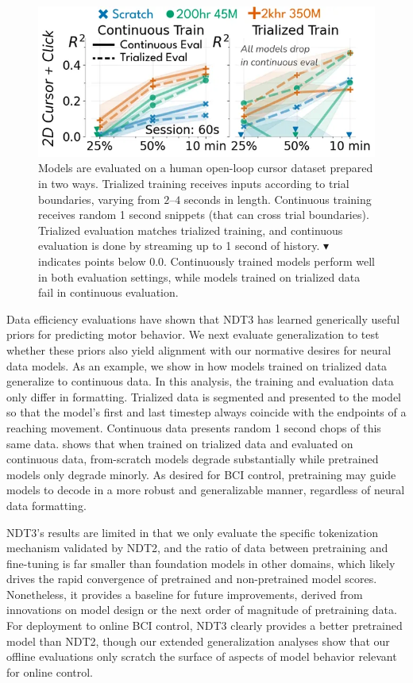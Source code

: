 \documentclass[12pt,oneside]{report}
\begin{document}
\begin{figure}[h]
  \centering
  \includegraphics[width=0.7\linewidth]{ch2_trialized.png}
  \caption{Models are evaluated on a human open-loop cursor dataset prepared in two ways.
  Trialized training receives inputs according to trial boundaries, varying from $2$--$4$ seconds in length.
  Continuous training receives random 1 second snippets (that can cross trial boundaries).
  Trialized evaluation matches trialized training, and continuous evaluation is done by streaming up to 1 second of history.
  $\blacktriangledown$ indicates points below 0.0.
  Continuously trained models perform well in both evaluation settings, while models trained on trialized data fail in continuous evaluation.}
  \label{fig:trialized}
\end{figure}
Data efficiency evaluations have shown that NDT3 has learned generically useful priors for predicting motor behavior. We next evaluate generalization to test whether these priors also yield alignment with our normative desires for neural data models. As an example, we show in  how models trained on trialized data generalize to continuous data.
In this analysis, the training and evaluation data only differ in formatting. Trialized data is segmented and presented to the model so that the model's first and last timestep always coincide with the endpoints of a reaching movement. Continuous data presents random 1 second chops of this same data.  shows that when trained on trialized data and evaluated on continuous data, from-scratch models degrade substantially while pretrained models only degrade minorly. As desired for BCI control, pretraining may guide models to decode in a more robust and generalizable manner, regardless of neural data formatting.

NDT3’s results are limited in that we only evaluate the specific tokenization mechanism validated by NDT2, and the ratio of data between pretraining and fine-tuning is far smaller than foundation models in other domains, which likely drives the rapid convergence of pretrained and non-pretrained model scores. Nonetheless, it provides a baseline for future improvements, derived from innovations on model design or the next order of magnitude of pretraining data. For deployment to online BCI control, NDT3 clearly provides a better pretrained model than NDT2, though our extended generalization analyses show that our offline evaluations only scratch the surface of aspects of model behavior relevant for online control.
\end{document}
